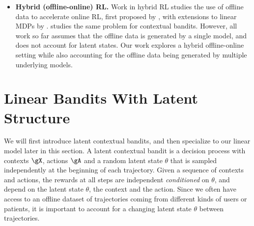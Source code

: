 \begin{itemize}
\item \textbf{Hybrid (offline-online) RL.} Work in hybrid RL studies the use of offline data to accelerate online RL, first proposed by \citet{song2023hybrid}, with extensions to linear MDPs by \citet{wagenmaker2023leveraging, tan2024hybrid}. \citet{cai2024transferlearningcontextualmultiarmed} studies the same problem for contextual bandits. However, all work so far assumes that the offline data is generated by a single model, and does not account for latent states. Our work explores a hybrid offline-online setting while also accounting for the offline data being generated by multiple underlying models.
\end{itemize}
 


\section{Linear Bandits With Latent Structure}

We will first introduce latent contextual bandits, and then specialize to our linear model later in this section. A latent contextual bandit is a decision process with contexts $\gX$, actions $\gA$ and a random latent state $\theta$ that is sampled independently at the beginning of each trajectory. Given a sequence of contexts and actions, the rewards at all steps are independent \textit{conditioned} on $\theta$, and depend on the latent state $\theta$, the context and the action. Since we often have access to an offline dataset of trajectories coming from different kinds of users or patients, it is important to account for a changing latent state $\theta$ between trajectories.

